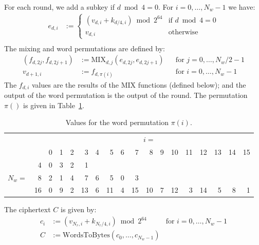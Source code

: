 \documentclass[11pt,twoside]{article}
\def\symdef#1{\label{symdef:#1}}
\newcommand{\mix}{\text{MIX}}
\newcommand{\WordsToBytes}{\text{WordsToBytes}\xspace}
\begin{document}
For each round, we add a subkey if $d \bmod 4 = 0$. For $i=0, \ldots, N_w-1$ we have: \symdef{e_di}
\begin{align*}
  e_{d,i} &:=
  \begin{cases}
    (v_{d,i} + k_{d/4,i}) \bmod 2^{64} & \text{if $d \bmod 4 = 0$}\\
     v_{d,i} & \text{otherwise}
            \end{cases}\\
\end{align*}
The mixing and word permutations are defined by: \symdef{f_di}
\begin{align*}
  (f_{d,2j}, f_{d,2j+1}) &:= \mix_{d,j}(e_{d,2j}, e_{d,2j+1})&&\text{for $j=0,\ldots,N_w/2-1$}\\
  v_{d+1,i} &:= f_{d,\pi(i)} &&\text{for $i=0,\ldots,N_w-1$}
\end{align*}
The $f_{d,i}$ values are the results of the MIX functions (defined below); and the output of the word permutation is the output of the round. The permutation $\pi()$ is given in Table~\ref{tab:wordPermutations}.
\begin{table}
  \begin{center}
    \setlength{\tabcolsep}{4.5pt}
    \begin{tabular}{@{}|r@{\,\,}r|rrrrrrrrrrrrrrrr|@{}}
    \hline
    &&\multicolumn{16}{c|}{$i=$}\\
    &&\phantom{0}0&\phantom{0}1&\phantom{0}2&\phantom{0}3&\phantom{0}4&\phantom{0}5&\phantom{0}6&\phantom{0}7&\phantom{0}8&\phantom{0}9&10&11&12&13&14&15\\
    \hline
            & 4& 0 & 3 & 2 &  1 &&&&&&&&&&&&\\
    $N_w =$ & 8& 2 & 1 & 4 &  7 & 6 &  5 & 0 &  3 &&&&&&&&\\
            &16& 0 & 9 & 2 & 13 & 6 & 11 & 4 & 15 & 10 & 7 & 12 & 3 & 14 & 5 & 8 & 1 \\
    \hline
    \end{tabular}
  \end{center}\caption{Values for the word permutation $\pi(i)$.}\symdef{pi}
  \label{tab:wordPermutations}
\end{table}

The ciphertext $C$ is given by: \symdef{c_i}\symdef{C}
\begin{align*}
  c_i &:= (v_{N_r,i} + k_{N_r/4,i}) \bmod 2^{64} & \text{for $i=0, \ldots, N_w-1$}\\
  C &:= \WordsToBytes( c_0, \ldots, c_{N_w-1} )
\end{align*}
\end{document}
